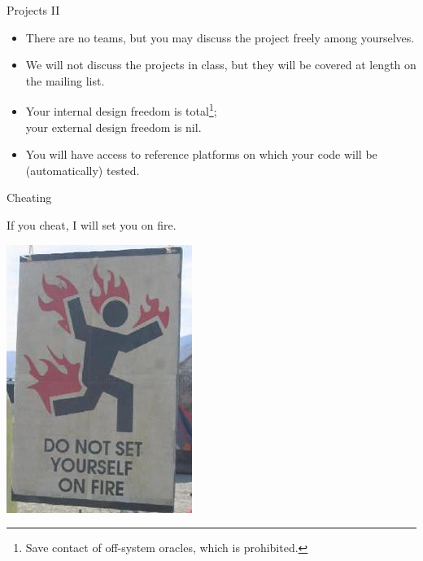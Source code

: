 \documentclass{beamer}
\begin{document}
\usebackgroundtemplate{}
\begin{frame}{Projects II}
\begin{itemize}
\item There are no teams, but you may discuss the project freely among
	yourselves.
\item We will not discuss the projects in class, but they will be
	covered at length on the mailing list.
\item Your internal design freedom is total\footnote{Save contact of off-system oracles, which is prohibited.};\\
your external design freedom is nil.
\item You will have access to reference platforms on which your code will be
	(automatically) tested.
\end{itemize}
\end{frame}

\begin{frame}{Cheating}
\begin{center}
If you cheat, I will set you on fire.
\vspace{.5in}

\includegraphics[scale=0.5]{images/setonfire.jpg}
\end{center}
\end{frame}
\end{document}
